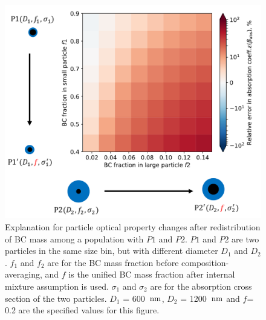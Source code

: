 \documentclass[edeposit,fullpage]{uiucthesis2009}
\makeatletter
\DeclareRobustCommand*\unit[1]
 {\ensuremath{%
   {\thinmuskip3mu\relax
    \def\mu{\text{\textmu}}\def~{\,}%
    \ifx\f@series\testbx\mathbf{#1}\else\mathrm{#1}\fi}}}
\makeatother
\begin{document}
\begin{figure}
	\centering
	\includegraphics[scale=0.6]{chap4_figs/fig_sup2.pdf}
	\caption{Explanation for particle optical property changes
          after redistribution of BC mass among a
          population with $P1$ and $P2$. $P1$ and $P2$ are two
          particles in the same size bin, but with different diameter
          $D_1$ and $D_2$. $f_1$ and $f_2$ are for the BC mass
          fraction before composition-averaging, and $f$ is the
          unified BC mass fraction after internal mixture assumption
          is used. $\sigma_1$ and $\sigma_2$ are for the absorption
          cross section of the two particles.  $D_1$ = 600~\unit{nm}, $D_2$ =
          1200~\unit{nm} and $f$= 0.2 are the specified values for this
          figure. }
	\label{fig_sup2}
\end{figure}

  
\end{document}
